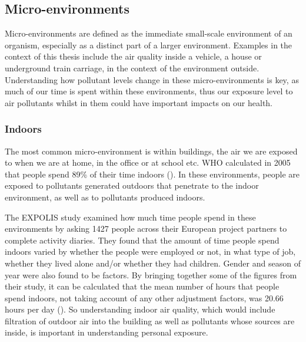 
\subsection{Micro-environments}
\label{subsec:microenvironments}
Micro-environments are defined as the immediate small-scale environment of an organism, especially as a distinct part of a larger environment. Examples in the context of this thesis include the air quality inside a vehicle, a house or  underground train carriage, in the context of the environment outside. Understanding how pollutant levels change in these micro-environments is key, as much of our time is spent within these environments, thus our exposure level to air pollutants whilst in them could have important impacts on our health.

\subsubsection{Indoors}
\label{subsubsec:indoors}

The most common micro-environment is within buildings, the air we are exposed to when we are at home, in the office or at school etc. WHO calculated in 2005 that people spend 89\% of their time indoors (\cite{WorldHealthOrganization2005}). In these environments, people are exposed to pollutants generated outdoors that penetrate to the indoor environment, as well as to pollutants produced indoors.

The EXPOLIS study examined how much time people spend in these environments by asking 1427 people across their European project partners to complete activity diaries. They found that the amount of time people spend indoors varied by whether the people were employed or not, in what type of job, whether they lived alone and/or whether they had children. Gender and season of year were also found to be factors. By bringing together some of the figures from their study, it can be calculated that the mean number of hours that people spend indoors, not taking account of any other adjustment factors, was 20.66 hours per day (\cite{Schweizer2007}). So understanding indoor air quality, which would include filtration of outdoor air into the building as well as pollutants whose sources are inside, is important in understanding personal exposure.


